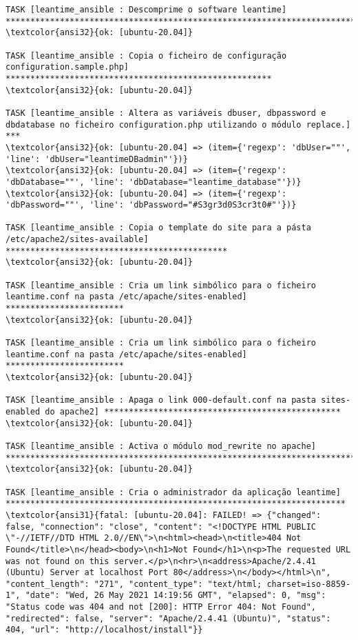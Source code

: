 \documentclass{scrartcl}
\begin{document}
\begin{Verbatim}
TASK [leantime_ansible : Descomprime o software leantime] ********************************************************************************
\textcolor{ansi32}{ok: [ubuntu-20.04]}

TASK [leantime_ansible : Copia o ficheiro de configuração configuration.sample.php] ******************************************************
\textcolor{ansi32}{ok: [ubuntu-20.04]}

TASK [leantime_ansible : Altera as variáveis dbuser, dbpassword e dbdatabase no ficheiro configuration.php utilizando o módulo replace.] ***
\textcolor{ansi32}{ok: [ubuntu-20.04] => (item={'regexp': 'dbUser=""', 'line': 'dbUser="leantimeDBadmin"'})}
\textcolor{ansi32}{ok: [ubuntu-20.04] => (item={'regexp': 'dbDatabase=""', 'line': 'dbDatabase="leantime_database"'})}
\textcolor{ansi32}{ok: [ubuntu-20.04] => (item={'regexp': 'dbPassword=""', 'line': 'dbPassword="#S3gr3d0S3cr3t0#"'})}

TASK [leantime_ansible : Copia o template do site para a pásta /etc/apache2/sites-available] *********************************************
\textcolor{ansi32}{ok: [ubuntu-20.04]}

TASK [leantime_ansible : Cria um link simbólico para o ficheiro leantime.conf na pasta /etc/apache/sites-enabled] ************************
\textcolor{ansi32}{ok: [ubuntu-20.04]}

TASK [leantime_ansible : Cria um link simbólico para o ficheiro leantime.conf na pasta /etc/apache/sites-enabled] ************************
\textcolor{ansi32}{ok: [ubuntu-20.04]}

TASK [leantime_ansible : Apaga o link 000-default.conf na pasta sites-enabled do apache2] ************************************************
\textcolor{ansi32}{ok: [ubuntu-20.04]}

TASK [leantime_ansible : Activa o módulo mod_rewrite no apache] **************************************************************************
\textcolor{ansi32}{ok: [ubuntu-20.04]}

TASK [leantime_ansible : Cria o administrador da aplicação leantime] *********************************************************************
\textcolor{ansi31}{fatal: [ubuntu-20.04]: FAILED! => {"changed": false, "connection": "close", "content": "<!DOCTYPE HTML PUBLIC \"-//IETF//DTD HTML 2.0//EN\">\n<html><head>\n<title>404 Not Found</title>\n</head><body>\n<h1>Not Found</h1>\n<p>The requested URL was not found on this server.</p>\n<hr>\n<address>Apache/2.4.41 (Ubuntu) Server at localhost Port 80</address>\n</body></html>\n", "content_length": "271", "content_type": "text/html; charset=iso-8859-1", "date": "Wed, 26 May 2021 14:19:56 GMT", "elapsed": 0, "msg": "Status code was 404 and not [200]: HTTP Error 404: Not Found", "redirected": false, "server": "Apache/2.4.41 (Ubuntu)", "status": 404, "url": "http://localhost/install"}}


\end{Verbatim}
\end{document}
